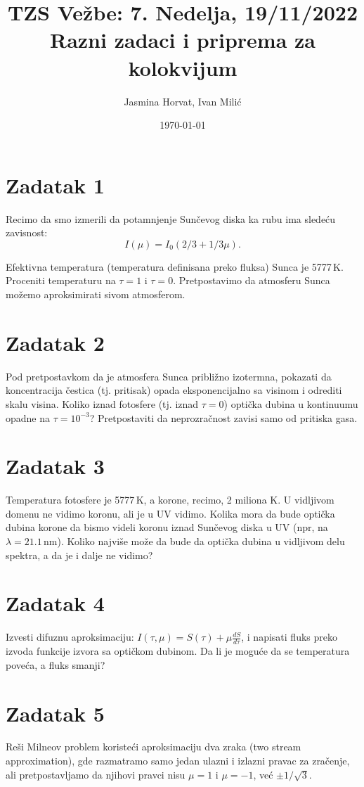 \documentclass[12pt]{article}
\title{TZS Ve\v{z}be: 7. Nedelja, 19/11/2022 \\
Razni zadaci i priprema za kolokvijum}
\author{Jasmina Horvat, Ivan Mili\'{c}}
\date{\today}
\begin{document}
\maketitle

\section*{Zadatak 1}
Recimo da smo izmerili da potamnjenje Sun\v{c}evog diska ka rubu ima slede\'{c}u zavisnost: 
$$I(\mu) = I_0(2/3 + 1/3 \mu).$$ 

Efektivna temperatura (temperatura definisana preko fluksa) Sunca je 5777\,K. Proceniti temperaturu na $\tau=1$ i $\tau=0$. Pretpostavimo da atmosferu Sunca mo\v{z}emo aproksimirati sivom atmosferom.


\section*{Zadatak 2}
Pod pretpostavkom da je atmosfera Sunca pribli\v{z}no izotermna, pokazati da koncentracija \v{c}estica (tj. pritisak) opada eksponencijalno sa visinom i odrediti skalu visina. Koliko iznad fotosfere (tj. iznad $\tau=0$) opti\v{c}ka dubina u kontinuumu opadne na $\tau = 10^{-3}$? Pretpostaviti da neprozra\v{c}nost zavisi samo od pritiska gasa. 

\section*{Zadatak 3}
Temperatura fotosfere je 5777\,K, a korone, recimo, 2 miliona K. U vidljivom domenu ne vidimo koronu, ali je u UV vidimo. Kolika mora da bude opti\v{c}ka dubina korone da bismo videli koronu iznad Sun\v{c}evog diska u UV (npr, na $\lambda = 21.1$\,nm). Koliko najvi\v{s}e mo\v{z}e da bude da opti\v{c}ka dubina u vidljivom delu spektra, a da je i dalje ne vidimo?

\section* {Zadatak 4}
Izvesti difuznu aproksimaciju: $I(\tau, \mu) = S(\tau) + \mu \frac{dS}{d\tau}$, i napisati fluks preko izvoda funkcije izvora sa opti\v{c}kom dubinom. Da li je mogu\'{c}e da se temperatura pove\'{c}a, a fluks smanji?

\section* {Zadatak 5}
Re\v{s}i Milneov problem koriste\'{c}i aproksimaciju dva zraka (two stream approximation), gde razmatramo samo jedan ulazni i izlazni pravac za zra\v{c}enje, ali pretpostavljamo da njihovi pravci nisu $\mu = 1$ i $\mu=-1$, ve\'{c} $\pm 1/\sqrt{3}$. 
\end{document}
